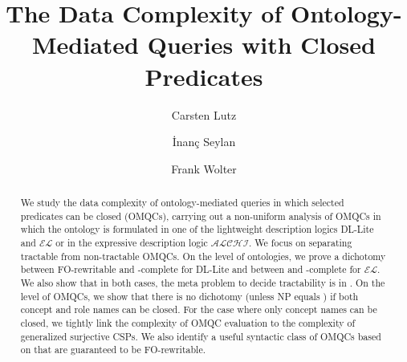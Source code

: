 \documentclass{lmcs}
\title[Ontology-Mediated Queries With Closed Predicates]{The Data Complexity of Ontology-Mediated Queries with Closed Predicates}
\author[Lutz]{Carsten Lutz}
\author[Seylan]{\.Inan\c{c} Seylan}
\author[Wolter]{Frank Wolter}
\theoremstyle{definition}
\begin{document}
\begin{abstract}
  We study the data complexity of ontology-mediated queries in which
  selected predicates can be closed (OMQCs), carrying out a
  non-uniform analysis of OMQCs in which the ontology is formulated in
  one of the lightweight description logics DL-Lite and $\mathcal{EL}$
  or in the expressive description logic $\mathcal{ALCHI}$. We focus
  on separating tractable from non-tractable OMQCs. On the level of
  ontologies, we prove a dichotomy between FO-rewritable and
  \conp-complete for DL-Lite and between \PTime and \conp-complete for
  $\mathcal{EL}$. We also show that in both cases, the meta problem to
  decide tractability is in \PTime. On the level of OMQCs, we show
  that there is no dichotomy (unless {\sc NP} equals \PTime) if both
  concept and role names can be closed. For the case where only concept
  names can be closed, we tightly link the complexity of OMQC
  evaluation to the complexity of generalized surjective CSPs.  We also identify a
  useful syntactic class of OMQCs based on \dlliter that are
  guaranteed to be FO-rewritable.
\end{abstract}

\maketitle
\end{document}
